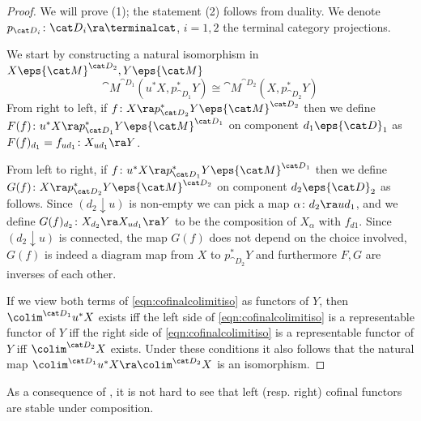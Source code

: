 \begin{proof}
We will prove (1); the statement (2) follows from duality. We denote $p_{{\cat D}_i} \colon {\cat D}_i \ra \terminalcat$, $i = 1, 2$ the terminal category projections.

We start by constructing a natural isomorphism in $X \eps {\cat M}^{{\cat D}_2}, Y \eps {\cat M}$
\begin{equation}
\label{eqn:cofinalcolimitiso}
{{\cat M}^{{\cat D}_1}}(u^*X, p_{{\cat D}_1}^*Y) \cong {{\cat M}^{{\cat D}_2}}(X, p_{{\cat D}_2}^*Y)
\end{equation}
From right to left, if $f \colon X \ra p_{{\cat D}_2}^*Y \eps {\cat M}^{{\cat D}_2}$ then we define $F(f) \colon u^*X \ra p_{{\cat D}_1}^*Y \eps {\cat M}^{{\cat D}_1}$ on component $d_1 \eps {\cat D}_1$ as $F(f)_{d_1} = f_{ud_1} \colon X_{ud_1} \ra Y$.

From left to right, if $f \colon u^*X \ra p_{{\cat D}_1}^*Y \eps {\cat M}^{{\cat D}_1}$ then we define $G(f) \colon X \ra p_{{\cat D}_2}^*Y \eps {\cat M}^{{\cat D}_2}$ on component $d_2 \eps {\cat D}_2$ as follows. Since $(d_2 \downarrow u)$ is non-empty we can pick a map $\alpha \colon d_2 \ra ud_1$, and we define $G(f)_{d_2} \colon X_{d_2} \ra X_{ud_1} \ra Y$ to be the composition of $X_\alpha$ with $f_{d1}$. Since $(d_2 \downarrow u)$ is connected, the map $G(f)$ does not depend on the choice involved, $G(f)$ is indeed a diagram map from $X$ to $p_{{\cat D}_2}^*Y$ and furthermore $F, G$ are inverses of each other.

If we view both terms of \ref{eqn:cofinalcolimitiso} as functors of $Y$, then $\colim^{{\cat D}_1}u^*X$ exists iff the left side of \ref{eqn:cofinalcolimitiso} is a representable functor of $Y$ iff the right side of \ref{eqn:cofinalcolimitiso} is a representable functor of $Y$ iff $\colim^{{\cat D}_2}X$ exists. Under these conditions it also follows that the natural map $\colim^{{\cat D}_1}u^*X \ra \colim^{{\cat D}_2}X$ is an isomorphism.
\end{proof}

As a consequence of , it is not hard to see that left (resp. right) cofinal functors are stable under composition. 

